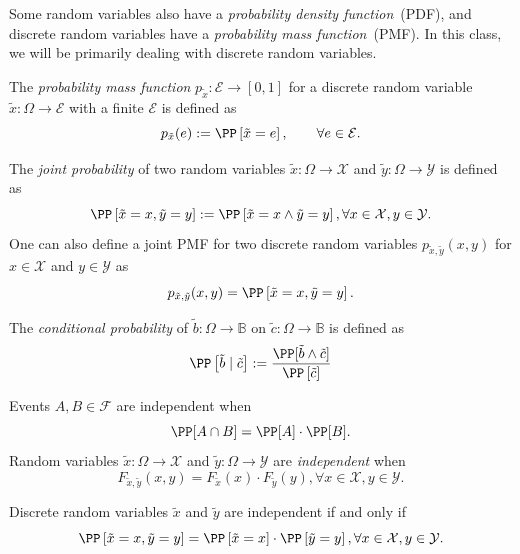 Some random variables also have a \emph{probability density function}~(PDF), and discrete random variables have a \emph{probability mass function}~(PMF). In this class, we will be primarily dealing with discrete random variables.
\begin{definition}[PMF]
The \emph{probability mass function} $p_{\tilde{x}}\colon \mathcal{E} \to [0,1]$ for a discrete random variable $\tilde{x}\colon \Omega  \to  \mathcal{E}$ with a finite $\mathcal{E}$ is defined as
  \[
    p_{\tilde{x}}(e) := \PP\left[\tilde{x} = e\right], \qquad \forall e\in \mathcal{E} .
 \]
\end{definition}


\begin{definition} \label{def:joint-probability}
The \emph{joint probability} of two random variables $\tilde{x}\colon \Omega \to \mathcal{X}$ and $\tilde{y} \colon \Omega \to \mathcal{Y}$ is defined as
\[
 \PP\left[\tilde{x} = x, \tilde{y} = y\right] := \PP\left[\tilde{x} = x \wedge \tilde{y} = y\right] , \forall  x\in \mathcal{X}, y\in \mathcal{Y}.
\]
One can also define a joint PMF for two discrete random variables $p_{\tilde{x}, \tilde{y}}(x,y)$ for $x\in \mathcal{X}$ and $y\in \mathcal{Y}$ as
\[
 p_{\tilde{x}, \tilde{y}}(x,y) = \PP\left[\tilde{x} = x, \tilde{y} = y\right]. 
\]
\end{definition}

\begin{definition} \label{def:probability_cnd}
The \emph{conditional probability} of $\tilde{b}\colon \Omega \to \mathbb{B}$ on $\tilde{c}\colon \Omega \to \mathbb{B}$ is defined as
\[
\PP\left[ \tilde{b} \mid  \tilde{c} \right]  := \frac{ \PP[\tilde{b} \wedge \tilde{c} ] }{ \PP \left[ \tilde{c} \right]}
\]
\end{definition}

\begin{definition}[Independent RV]
  Events $A,B \in \mathcal{F}$ are independent when
  \[
   \PP[ A \cap B ] = \PP[ A ] \cdot \PP[ B ].
  \]
  Random variables $\tilde{x}\colon \Omega \to \mathcal{X}$ and $\tilde{y}\colon \Omega \to \mathcal{Y}$ are \emph{independent} when
  \[
    F_{\tilde{x}, \tilde{y}}(x,y) = F_{\tilde{x}}(x) \cdot F_{\tilde{y}}(y),
    \forall x\in \mathcal{X}, y\in \mathcal{Y}.
  \]
\end{definition}
Discrete random variables $\tilde{x}$ and $\tilde{y}$ are independent if and only if
\[
  \PP\left[\tilde{x} = x, \tilde{y} = y\right] = \PP\left[\tilde{x} = x\right] \cdot \PP\left[\tilde{y} = y\right], \forall x\in \mathcal{X}, y\in \mathcal{Y}.
\]


